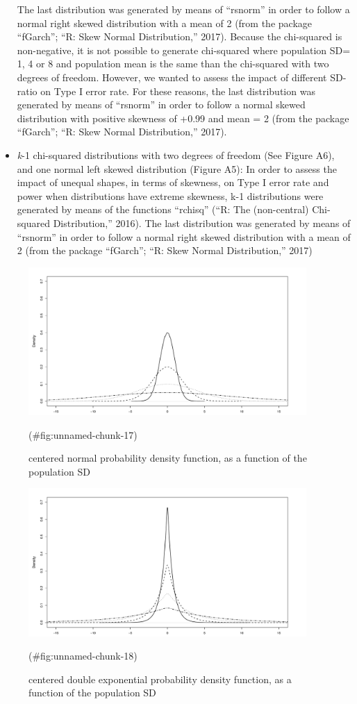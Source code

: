 \begin{appendix}
\begin{itemize}
  The last distribution was generated by means of ``rsnorm'' in order to
  follow a normal right skewed distribution with a mean of 2 (from the
  package ``fGarch''; ``R: Skew Normal Distribution,'' 2017). Because
  the chi-squared is non-negative, it is not possible to generate
  chi-squared where population SD= 1, 4 or 8 and population mean is the
  same than the chi-squared with two degrees of freedom. However, we
  wanted to assess the impact of different SD-ratio on Type I error
  rate. For these reasons, the last distribution was generated by means
  of ``rsnorm'' in order to follow a normal skewed distribution with
  positive skewness of +0.99 and mean = 2 (from the package ``fGarch'';
  ``R: Skew Normal Distribution,'' 2017).
\item
  \emph{k}-1 chi-squared distributions with two degrees of freedom (See
  Figure A6), and one normal left skewed distribution (Figure A5): In
  order to assess the impact of unequal shapes, in terms of skewness, on
  Type I error rate and power when distributions have extreme skewness,
  k-1 distributions were generated by means of the functions ``rchisq''
  (``R: The (non-central) Chi-squared Distribution,'' 2016). The last
  distribution was generated by means of ``rsnorm'' in order to follow a
  normal right skewed distribution with a mean of 2 (from the package
  ``fGarch''; ``R: Skew Normal Distribution,'' 2017)
\end{itemize}

\begin{figure}
\includegraphics[width=400px]{W-test_files/figure-latex/unnamed-chunk-17-1} \caption{centered normal probability density function, as a function of the population SD}(\#fig:unnamed-chunk-17)
\end{figure}

\begin{figure}
\includegraphics[width=400px]{W-test_files/figure-latex/unnamed-chunk-18-1} \caption{centered double exponential probability density function, as a function of the population SD}(\#fig:unnamed-chunk-18)
\end{figure}


\end{appendix}
